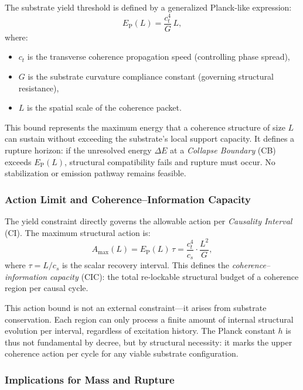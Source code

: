 \documentclass[preprints,article,submit,pdftex,moreauthors]{Definitions/mdpi}
\begin{document}
The substrate yield threshold is defined by a generalized Planck-like expression:
\begin{equation}
E_{\mathrm{P}}(L) = \frac{c_t^4}{G}\,L,
\label{eq:substrate-yield}
\end{equation}
where:
\begin{itemize}
    \item \( c_t \) is the transverse coherence propagation speed (controlling phase spread),
    \item \( G \) is the substrate curvature compliance constant (governing structural resistance),
    \item \( L \) is the spatial scale of the coherence packet.
\end{itemize}

This bound represents the maximum energy that a coherence structure of size \( L \) can sustain without exceeding the substrate’s local support capacity. It defines a rupture horizon: if the unresolved energy \( \Delta E \) at a \emph{Collapse Boundary} (CB) exceeds \( E_{\mathrm{P}}(L) \), structural compatibility fails and rupture must occur. No stabilization or emission pathway remains feasible.

\subsubsection*{Action Limit and Coherence–Information Capacity}

The yield constraint directly governs the allowable action per \emph{Causality Interval} (CI). The maximum structural action is:
\begin{equation}
A_{\max}(L) = E_{\mathrm{P}}(L)\,\tau = \frac{c_t^4}{c_s} \cdot \frac{L^2}{G},
\end{equation}
where \( \tau = L/c_s \) is the scalar recovery interval. This defines the \emph{coherence–information capacity} (CIC): the total re-lockable structural budget of a coherence region per causal cycle.

This action bound is not an external constraint—it arises from substrate conservation. Each region can only process a finite amount of internal structural evolution per interval, regardless of excitation history. The Planck constant \( h \) is thus not fundamental by decree, but by structural necessity: it marks the upper coherence action per cycle for any viable substrate configuration.

\subsubsection*{Implications for Mass and Rupture}
\end{document}
